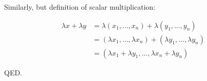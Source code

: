 \documentclass{article}
\begin{document}
Similarly, but definition of scalar multiplication:

\begin{align*}
\lambda x+\lambda y&=\lambda(x_1, \ldots,x_n)+\lambda(y_1, \ldots,y_n) \\
&=(\lambda x_1, \ldots, \lambda x_n) + (\lambda y_1, \ldots, \lambda y_n)\\
&=(\lambda x_1 + \lambda y_1, \ldots, \lambda x_n + \lambda y_n)
\end{align*}

QED.
\end{document}
